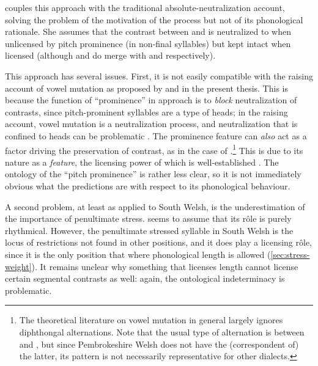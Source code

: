 \citet{bosch96:_promin} couples this approach with the traditional absolute\hyp neutralization account, solving the problem of the motivation of the process but not of its phonological rationale. She assumes that the contrast between  and  is neutralized to \ipa{[ə]} when unlicensed by pitch prominence (\ie in non-final syllables) but kept intact when licensed (although  and  do merge with  and  respectively).

This approach has several issues. First, it is not easily compatible with the raising account of vowel mutation as proposed by \citet{hannahs07:_const_welsh} and in the present thesis. This is because the function of \enquote{prominence} in  approach is to \emph{block} neutralization of contrasts, since pitch\hyp prominent syllables are a type of heads; in the raising account, vowel mutation is a neutralization process, and neutralization that is confined to heads can be problematic \citep{teeple09:_bicon}. The prominence feature can \emph{also} act as a factor driving the preservation of contrast, as in the case of \ipa{[ai]}.\footnote{The theoretical literature on vowel mutation in general largely ignores diphthongal alternations. Note that the usual type of alternation is between \ipa{[aɨ]} and \ipa{[əɨ]}, but since Pembrokeshire Welsh does not have the (correspondent of) the latter, its pattern is not necessarily representative for other dialects.} This is due to its nature as a \emph{feature}, the licensing power of which is well\hyp established \citep[\egm][]{archangeli-pulleyblank,ringen98:_hungar_optim_theor,walker05:_weak_trigg_vowel_harmon,walker11:_vowel}. The ontology of the \enquote{pitch prominence} is rather less clear, so it is not immediately obvious what the predictions are with respect to its phonological behaviour.

A second problem, at least as applied to South Welsh, is the underestimation of the importance of penultimate stress. \citet{bosch96:_promin} seems to assume that its rôle is purely rhythmical. However, the penultimate stressed syllable in South Welsh is the locus of restrictions  not found in other positions, and it does play a licensing rôle, since it is the only position that where phonological length is allowed (\cref{sec:stress-weight}). It remains unclear why something that licenses length cannot license certain segmental contrasts as well: again, the ontological indeterminacy is problematic.

